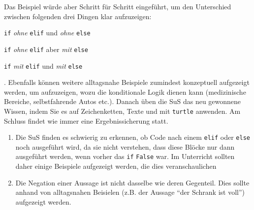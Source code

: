 \begin{myExBox}[title=DL \themycounter]
\begin{minipage}[H]{.55\textwidth}
\begin{figure}[H]
\end{figure}
\end{minipage}
Das Beispiel würde aber Schritt für Schritt eingeführt, um den Unterschied zwischen folgenden drei Dingen klar aufzuzeigen: \begin{enumerate*}
\item \lstinline|if| \textit{ohne} \lstinline|elif| und \textit{ohne} \lstinline|else| 
\item \lstinline|if| \textit{ohne} \lstinline|elif| aber \textit{mit} \lstinline|else| 
\item \lstinline|if| \textit{mit} \lstinline|elif| und \textit{mit} \lstinline|else|
\end{enumerate*}. Ebenfalls können weitere alltagsnahe Beispiele zumindest konzeptuell aufgezeigt werden, um aufzuzeigen, wozu die konditionale Logik dienen kann (medizinische Bereiche, selbstfahrende Autos etc.). Danach üben die SuS das neu gewonnene Wissen, indem Sie es auf Zeichenketten, Texte und mit \lstinline|turtle| anwenden. Am Schluss findet wie immer eine Ergebnissicherung statt.

\begin{myExBox}[title=Mögliche Schwierigkeiten \& geeignete Massnahmen]
\begin{enumerate}
    \item Die SuS finden es schwierig zu erkennen, ob Code nach einem \lstinline|elif| oder \lstinline|else| noch ausgeführt wird, da sie nicht verstehen, dass diese Blöcke nur dann ausgeführt werden, wenn vorher das \lstinline|if| \lstinline|False| war. Im Unterricht sollten daher einige Beispiele aufgezeigt werden, die dies veranschaulichen
    \item Die Negation einer Aussage ist nicht dasselbe wie deren Gegenteil. Dies sollte anhand von alltagsnahen Beisielen (z.B. der Aussage ``der Schrank ist voll'') aufgezeigt werden.
 \end{enumerate}
\end{myExBox}
\end{myExBox}
\newpage{}

